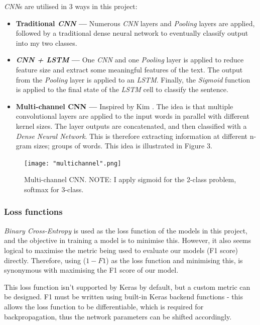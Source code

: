 \documentclass[12pt,a4paper]{article}
\begin{document}
	\textit{CNN}s are utilised in 3 ways in this project:
	\begin{itemize}
		\item \textbf{Traditional \textit{CNN} --- }Numerous \textit{CNN} layers and \textit{Pooling} layers are applied, followed by a traditional dense neural network to eventually classify output into my two classes.
		\item \textbf{\textit{CNN + LSTM} --- }One \textit{CNN} and one \textit{Pooling} layer is applied to reduce feature size and extract some meaningful features of the text. The output from the \textit{Pooling} layer is applied to an \textit{LSTM}. Finally, the \textit{Sigmoid} function is applied to the final state of the \textit{LSTM} cell to classify the sentence.
		\item \textbf{Multi-channel CNN --- }Inspired by Kim \citeyear{Kim}. The idea is that multiple convolutional layers are applied to the input words in parallel with different kernel sizes. The layer outputs are concatenated, and then classified with a \textit{Dense Neural Network}. This is therefore extracting information at different n-gram sizes; groups of words. This idea is illustrated in Figure 3.
	\end{itemize}

	\begin{figure}[h]
		\centering
		\label{multichannel}
		\texttt{[image: "multichannel".png]}
		\caption{Multi-channel CNN. NOTE: I apply sigmoid for the 2-class problem, softmax for 3-class.}
	\end{figure}

	\subsubsection{Loss functions}
	\textit{Binary Cross-Entropy} is used as the loss function of the models in this project, and the objective in training a model is to minimise this. However, it also seems logical to maximise the metric being used to evaluate our models (F1 score) directly. Therefore, using ($1-F1$) as the loss function and minimising this, is synonymous with maximising the F1 score of our model. 
	
	This loss function isn't supported by Keras by default, but a custom metric can be designed. F1 must be written using built-in Keras backend functions - this allows the loss function to be differentiable, which is required for backpropagation, thus the network parameters can be shifted accordingly.
	
\end{document}
